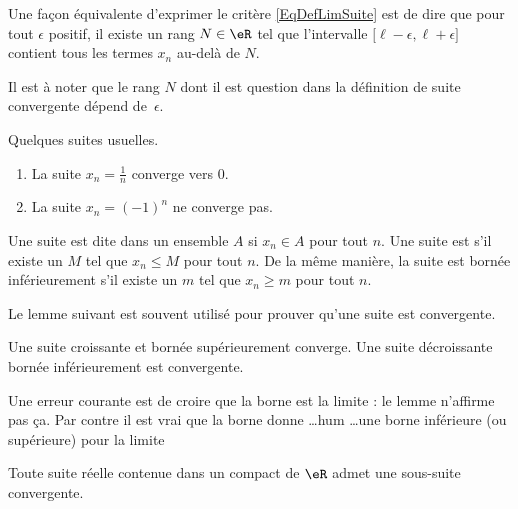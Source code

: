 Une façon équivalente d'exprimer le critère \eqref{EqDefLimSuite} est de dire que pour tout $\epsilon$ positif, il existe un rang $N\in\eR$ tel que l'intervalle $\mathopen[ \ell-\epsilon , \ell+\epsilon \mathclose]$ contient tous les termes $x_n$ au-delà de $N$.

Il est à noter que le rang $N$ dont il est question dans la définition de suite convergente dépend de~$\epsilon$.

\begin{example}
	Quelques suites usuelles.
	\begin{enumerate}
		\item
			La suite $x_n=\frac{1}{ n }$ converge vers $0$.
		\item
			La suite $x_n=(-1)^n$ ne converge pas.
	\end{enumerate}
\end{example}

Une suite est dite  dans un ensemble $A$ si $x_n\in A$ pour tout $n$. Une suite est  s'il existe un $M$ tel que $x_n\leq M$ pour tout $n$. De la même manière, la suite est bornée inférieurement s'il existe un $m$ tel que $x_n\geq m$ pour tout $n$.

Le lemme suivant est souvent utilisé pour prouver qu'une suite est convergente.
\begin{lemma}		\label{LemSuiteCrBorncv}
	Une suite croissante et bornée supérieurement converge. Une suite décroissante bornée inférieurement est convergente.
\end{lemma}

Une erreur courante est de croire que la borne est la limite : le lemme n'affirme pas ça. Par contre il est vrai que la borne donne \ldots hum \ldots une borne inférieure (ou supérieure) pour la limite

\begin{theorem}     \label{THOooRDYOooJHLfGq}
	Toute suite réelle contenue dans un compact de \( \eR\) admet une sous-suite convergente.
\end{theorem}

